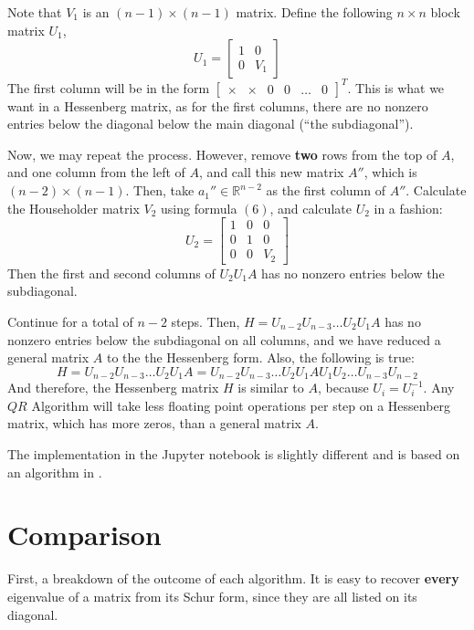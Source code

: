 \documentclass{article}
\begin{document}
Note that $V_1$ is an $(n-1)\times(n-1)$ matrix. Define the following $n\times n$ block matrix $U_1$,
\begin{equation*}
    U_1=\begin{bmatrix}
		1 & 0 \\
		0 & V_1
    \end{bmatrix}
\end{equation*}
The first column will be in the form $\begin{bmatrix}
	\times & \times & 0 & 0 & \ldots & 0
\end{bmatrix}^T$. This is what we want in a Hessenberg matrix, as for the first columns, there are no nonzero entries below the diagonal below the main diagonal (``the subdiagonal'').

Now, we may repeat the process. However, remove \textbf{two} rows from the top of $A$, and one column from the left of $A$, and call this new matrix $A''$, which is $(n-2)\times(n-1)$. Then, take $a_1''\in\mathbb R^{n-2}$ as the first column of $A''$. Calculate the Householder matrix $V_2$ using formula $(6)$, and calculate $U_2$ in a fashion:
\begin{equation*}
    U_2=\begin{bmatrix}
		1 & 0 & 0 \\
		0 & 1 & 0 \\
		0 & 0 & V_2
    \end{bmatrix}
\end{equation*}
Then the first and second columns of $U_2U_1A$ has no nonzero entries below the subdiagonal.

Continue for a total of $n-2$ steps. Then, $H=U_{n-2}U_{n-3}\ldots U_2U_1A$ has no nonzero entries below the subdiagonal on all columns, and we have reduced a general matrix $A$ to the the Hessenberg form. Also, the following is true:
\begin{equation*}
	H
	=U_{n-2}U_{n-3}\ldots U_2U_1A
	=U_{n-2}U_{n-3}\ldots U_2U_1AU_1U_2\ldots U_{n-3}U_{n-2}
\end{equation*}
And therefore, the Hessenberg matrix $H$ is similar to $A$, because $U_i=U_i^{-1}$. Any $QR$ Algorithm will take less floating point operations per step on a Hessenberg matrix, which has more zeros, than a general matrix $A$.

The implementation in the Jupyter notebook is slightly different and is based on an algorithm in \cite{mit}.

\section{Comparison}
First, a breakdown of the outcome of each algorithm. It is easy to recover \textbf{every} eigenvalue of a matrix from its Schur form, since they are all listed on its diagonal.
\end{document}
